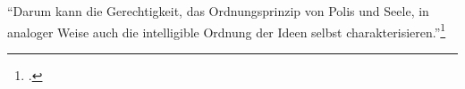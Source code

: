 \enquote{Darum kann die Gerechtigkeit, das Ordnungsprinzip von Polis und Seele, in analoger Weise auch die intelligible Ordnung der Ideen selbst charakterisieren.}\footcite[][S. 242]{halfwassenaufstieg2006}

